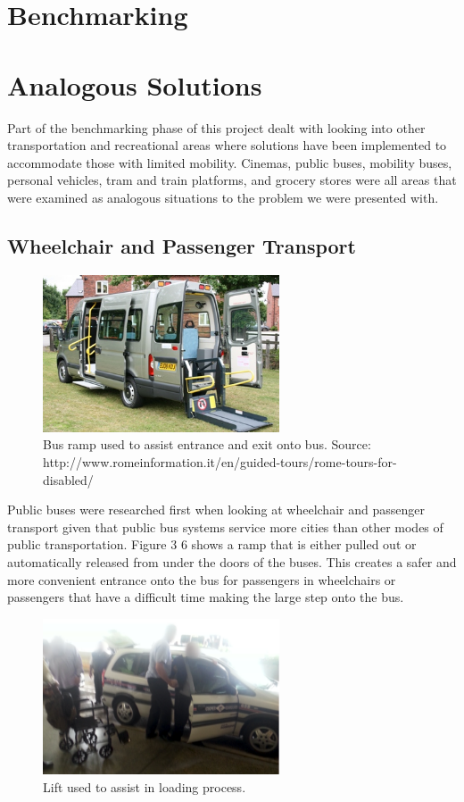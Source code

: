 \documentclass[a4paper, 12pt,conference]{new_cit_thesis}
\begin{document}
\section{Benchmarking}
\section*{Analogous Solutions}
Part of the benchmarking phase of this project dealt with looking into other transportation and recreational areas where solutions have been implemented to accommodate those with limited mobility.  Cinemas, public buses, mobility buses, personal vehicles, tram and train platforms, and grocery stores were all areas that were examined as analogous situations to the problem we were presented with.

\subsection{Wheelchair and Passenger Transport}

\begin{figure}[h]
  \centering
     \includegraphics[width=7cm]{images/image042}
   \caption{Bus ramp used to assist entrance and exit onto bus. Source: http://www.romeinformation.it/en/guided-tours/rome-tours-for-disabled/}
  \label{fig:42}
\end{figure}

Public buses were researched first when looking at wheelchair and passenger transport given that public bus systems service more cities than other modes of public transportation.  Figure 3 6 shows a ramp that is either pulled out or automatically released from under the doors of the buses.  This creates a safer and more convenient entrance onto the bus for passengers in wheelchairs or passengers that have a difficult time making the large step onto the bus. 

\begin{figure}[h]
  \centering
     \includegraphics[width=7cm]{images/image039}
   \caption{Lift used to assist in loading process.}%
  \label{fig:39}
\end{figure}
\end{document}
